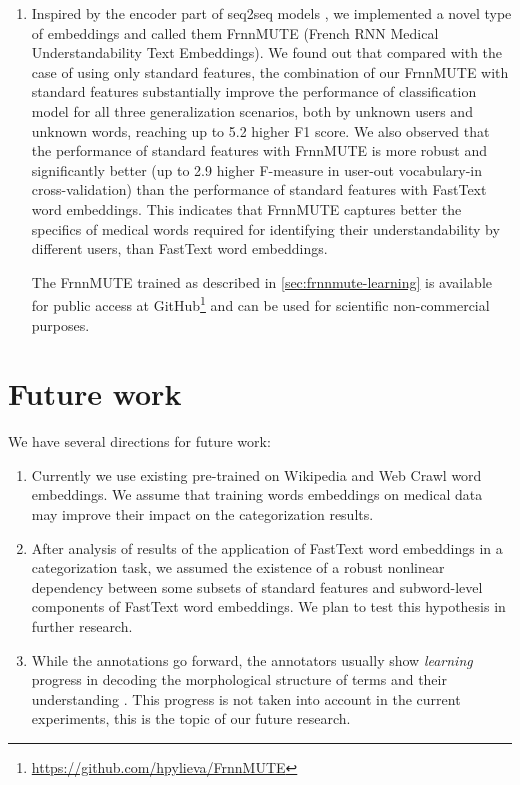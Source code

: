 \begin{enumerate}[listparindent=1.5em]
    These results of applying FastText word embeddings for automatic words' categorization on data from three annotators were published and presented on 1st International Workshop on Informatics \& Data-Driven Medicine \footnote{\url{http://science.lpnu.ua/iddm-2018}} \citep{Pylieva:2018}.
    
    \item Inspired by the encoder part of seq2seq models \citep{Sutskever-NIPS2014}, we implemented a novel type of embeddings and called them FrnnMUTE (French RNN Medical Understandability Text Embeddings). We found out that compared with the case of using only standard features, the combination of our FrnnMUTE with standard features substantially improve the performance of classification model for all three generalization scenarios, both by unknown users and unknown words, reaching up to 5.2 higher F1 score. We also observed that the performance of standard features with FrnnMUTE is more robust and significantly better (up to 2.9 higher F-measure in user-out vocabulary-in cross-validation) than the performance of standard features with FastText word embeddings. This indicates that FrnnMUTE captures better the specifics of medical words required for identifying their understandability by different users, than FastText word embeddings.
    
    The FrnnMUTE trained as described in \ref{sec:frnnmute-learning} is available for public access at GitHub\footnote{\url{https://github.com/hpylieva/FrnnMUTE}} and can be used for scientific non-commercial purposes.
\end{enumerate}

\section{Future work}
We have several directions for future work:
\begin{enumerate}
    \item Currently we use existing pre-trained on Wikipedia and Web Crawl word embeddings. We assume that training words embeddings on medical data may improve their impact on the categorization results.
    
    \item After analysis of results of the application of FastText word embeddings in a categorization task, we assumed the existence of a robust nonlinear dependency between some subsets of standard features and subword-level components of FastText word embeddings. We plan to test this hypothesis in further research.
    
    \item While the annotations go forward, the annotators usually show {\it learning} progress in decoding the morphological structure of terms and their understanding \citep{Grabar-BIONLP2017}. This progress is not taken into account in the current experiments, this is the topic of our future research. 
\end{enumerate}
